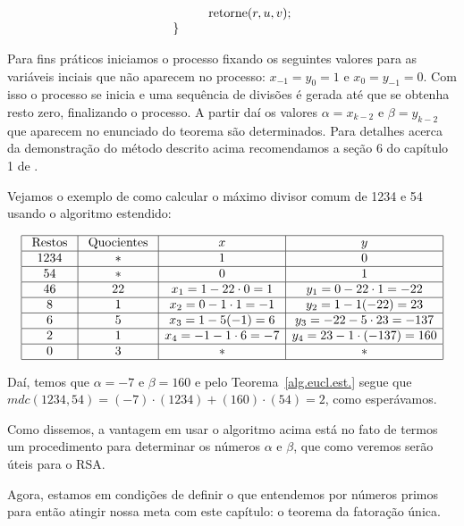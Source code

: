 \[\begin{array}{l}
\hspace{10mm}	\textmd{retorne} (r, u, v); \\
\}\\
\end{array}
\]

Para fins pr\'{a}ticos iniciamos o processo fixando os seguintes valores para as vari\'{a}veis inciais
que n\~{a}o aparecem no processo: $x_{-1}=y_{0}=1$ e $x_{0}=y_{-1}=0$. Com isso o processo se inicia e 
uma sequ\^{e}ncia de divis\~{o}es \'{e} gerada at\'{e} que se obtenha resto zero, finalizando o processo. 
A partir da\'{i} os valores $\alpha=x_{k-2}$ e $\beta=y_{k-2}$ que aparecem no 
enunciado do teorema s\~{a}o determinados. Para detalhes acerca da demonstra\c{c}\~{a}o do m\'{e}todo descrito acima recomendamos 
a se\c{c}\~{a}o 6 do cap\'{i}tulo 1 de \cite{cou:2014}. 

Vejamos o exemplo de como calcular o m\'{a}ximo divisor comum de 1234 e 54 usando o algoritmo estendido:

\[
\begin{array}{|c|c|c|c|}\hline
\textrm{ Restos } & \textrm{ Quocientes } & x       								& y \\ \hline
				1234 	    & \ast     							& 1      									& 0 \\ \hline
				54  			& \ast     							& 0       								& 1 \\ \hline
				46        & 22   					 	  		& x_{1}=1-22\cdot 0 = 1   & y_{1}=0-22\cdot 1=-22 \\ \hline
				8     		& 1    									& x_{2}=0-1\cdot 1=-1     & y_{2}=1-1(-22)=23 \\ \hline
				6    	  	& 5    									& x_{3}=1-5(-1)=6         & y_{3}=-22-5\cdot 23=-137 \\ \hline  
				2    			& 1   									& x_{4}=-1-1\cdot 6=-7    & y_{4}=23-1\cdot(-137)=160 \\ \hline
				0   			& 3  										& \ast                    & \ast    \\ \hline
\end{array}
\]

Da\'{i}, temos que $\alpha=-7$ e $\beta=160$ e pelo Teorema~\ref{alg.eucl.est.} segue que
$mdc(1234,54)=(-7)\cdot(1234)+(160)\cdot(54)=2$, como esper\'{a}vamos.

Como dissemos, a vantagem em usar o algoritmo acima est\'{a} no fato de termos um procedimento para determinar os n\'{u}meros
$\alpha$ e $\beta$, que como veremos ser\~{a}o \'{u}teis para o RSA.

Agora, estamos em condi\c{c}\~{o}es de definir o que entendemos por n\'umeros primos para ent\~ao atingir nossa meta com este 
cap\'itulo: o teorema da fatora\c{c}\~ao \'unica.

